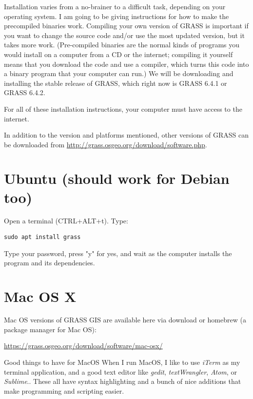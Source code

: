 \documentclass{book}
\begin{document}
Installation varies from a no-brainer to a difficult task, depending on your operating system. I am going to be giving instructions for how to make the precompiled binaries work. Compiling your own version of GRASS is important if you want to change the source code and/or use the most updated version, but it takes more work. (Pre-compiled binaries are the normal kinds of programs you would install on a computer from a CD or the internet; compiling it yourself means that you download the code and use a compiler, which turns this code into a binary program that your computer can run.) We will be downloading and installing the stable release of GRASS, which right now is GRASS 6.4.1 or GRASS 6.4.2.

For all of these installation instructions, your computer must have access to the internet.

In addition to the version and platforms mentioned, other versions of GRASS can be downloaded from \url{http://grass.osgeo.org/download/software.php}.

\section{Ubuntu (should work for Debian too)}

Open a terminal (CTRL+ALT+t). Type:
\begin{lstlisting}
sudo apt install grass
\end{lstlisting}
Type your password, press "y" for yes, and wait as the computer installs the program and its dependencies.

\section{Mac OS X}

Mac OS versions of GRASS GIS are available here via download or homebrew (a package manager for Mac OS):

\url{https://grass.osgeo.org/download/software/mac-osx/}

\begin{boxx}[!ht]
\begin{bclogo}[arrondi = 0.1, logo = \bcrosevents]{Good things to have for MacOS}
When I run MacOS, I like to use \emph{iTerm} as my terminal application, and a good text editor like \emph{gedit}, \emph{textWrangler}, \emph{Atom}, or \emph{Sublime}.. These all have syntax highlighting and a bunch of nice additions that make programming and scripting easier.
\end{bclogo}
\caption{Good things to have for MacOS}
\end{boxx}
\end{document}
